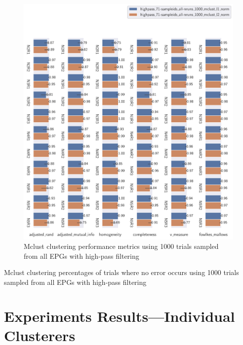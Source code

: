 \begin{theappendices}
\begin{figure}[htbp]
\centering
\includegraphics[width=\textwidth]{./figures/clust_comparison/highpass_71-sampleids_all-nruns_1000_mclust.pdf}
\caption{Mclust clustering performance metrics using 1000 trials sampled from all EPGs with high-pass filtering}
\label{appendix:fig:highpass_71-sampleids_all-nruns_1000_mclust}
\end{figure}

\begin{table}[htbp]
\centering
{}
\caption{Mclust clustering percentages of trials where no error occurs using 1000 trials sampled from all EPGs with high-pass filtering}
\label{appendix:table:highpass_71-sampleids_all-nruns_1000_mclust}
\end{table}

\section{Experiments Results---Individual Clusterers}


\end{theappendices}
